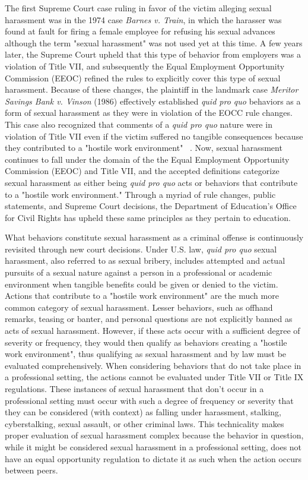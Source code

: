 The first Supreme Court case ruling in favor of the victim alleging sexual harassment was in the 1974 case \textit{Barnes v. Train}, in which the harasser was found at fault for firing a female employee for refusing his sexual advances although the term "sexual harassment" was not used yet at this time. A few years later, the Supreme Court upheld that this type of behavior from employers was a violation of Title VII, and subsequently the Equal Employment Opportunity Commission (EEOC) refined the rules to explicitly cover this type of sexual harassment. Because of these changes, the plaintiff in the landmark case \textit{Meritor Savings Bank v. Vinson} (1986) effectively established \textit{quid pro quo} behaviors as a form of sexual harassment as they were in violation of the EOCC rule changes. This case also recognized that comments of a \textit{quid pro quo} nature were in violation of Title VII even if the victim suffered no tangible consequences because they contributed to a "hostile work environment" ~\cite{bostonLawReview}. Now, sexual harassment continues to fall under the domain of the the Equal Employment Opportunity Commission (EEOC) and Title VII, and the accepted definitions categorize sexual harassment as either being \textit{quid pro quo} acts or behaviors that contribute to a "hostile work environment." Through a myriad of rule changes, public statements, and Supreme Court decisions, the Department of Education's Office for Civil Rights has upheld these same principles as they pertain to education.

What behaviors constitute sexual harassment as a criminal offense is continuously revisited through new court decisions. Under U.S. law, \textit{quid pro quo} sexual harassment, also referred to as sexual bribery, includes attempted and actual pursuits of a sexual nature against a person in a professional or academic environment when tangible benefits could be given or denied to the victim. Actions that contribute to a "hostile work environment" are the much more common category of sexual harassment. Lesser behaviors, such as offhand remarks, teasing or banter, and personal questions are not explicitly banned as acts of sexual harassment. However, if these acts occur with a sufficient degree of severity or frequency, they would then qualify as behaviors creating a "hostile work environment", thus qualifying as sexual harassment and by law must be evaluated comprehensively. When considering behaviors that do not take place in a professional setting, the actions cannot be evaluated under Title VII or Title IX regulations. These instances of sexual harassment that don't occur in a professional setting must occur with such a degree of frequency or severity that they can be considered (with context) as falling under harassment, stalking, cyberstalking, sexual assault, or other criminal laws. This technicality makes proper evaluation of sexual harassment complex because the behavior in question, while it might be considered sexual harassment in a professional setting, does not have an equal opportunity regulation to dictate it as such when the action occurs between peers.

